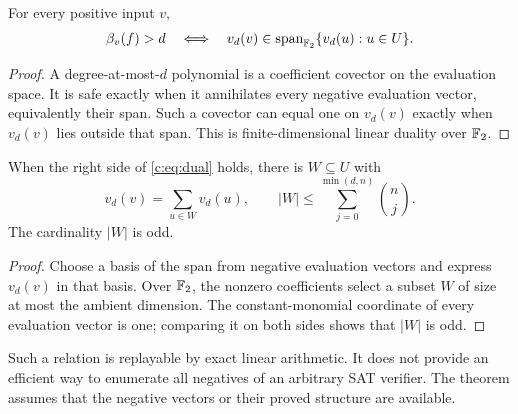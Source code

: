 \begin{theorem}\label{c:thm:dual}
For every positive input $v$,
\begin{equation}\label{c:eq:dual}
 \beta_v(f)>d
 \quad\Longleftrightarrow\quad
 v_d(v)\in\operatorname{span}_{\mathbb F_2}\{v_d(u):u\in U\}.
\end{equation}
\end{theorem}
\begin{proof}
A degree-at-most-$d$ polynomial is a coefficient covector on the evaluation space. It is safe exactly when it annihilates every negative evaluation vector, equivalently their span. Such a covector can equal one on $v_d(v)$ exactly when $v_d(v)$ lies outside that span. This is finite-dimensional linear duality over $\mathbb F_2$.
\end{proof}

\begin{corollary}\label{c:cor:dual-witness}
When the right side of \eqref{c:eq:dual} holds, there is $W\subseteq U$ with
\[
 v_d(v)=\sum_{u\in W}v_d(u),\qquad
 |W|\le\sum_{j=0}^{\min(d,n)}\binom nj.
\]
The cardinality $|W|$ is odd.
\end{corollary}
\begin{proof}
Choose a basis of the span from negative evaluation vectors and express $v_d(v)$ in that basis. Over $\mathbb F_2$, the nonzero coefficients select a subset $W$ of size at most the ambient dimension. The constant-monomial coordinate of every evaluation vector is one; comparing it on both sides shows that $|W|$ is odd.
\end{proof}
Such a relation is replayable by exact linear arithmetic. It does not provide an efficient way to enumerate all negatives of an arbitrary SAT verifier. The theorem assumes that the negative vectors or their proved structure are available.

